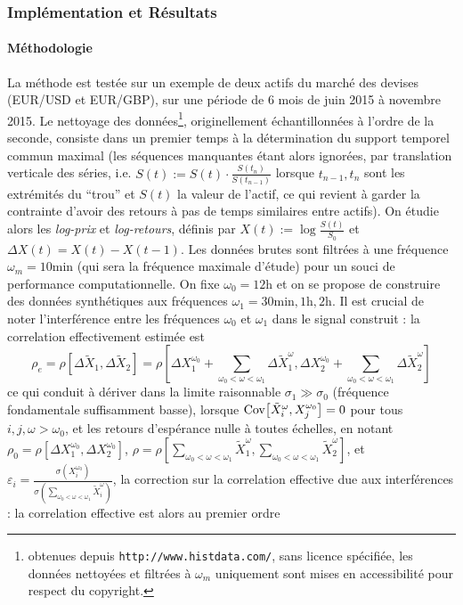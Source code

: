 \subsubsection{Implémentation et Résultats}

\paragraph{Méthodologie}

La méthode est testée sur un exemple de deux actifs du marché des devises (EUR/USD et EUR/GBP), sur une période de 6 mois de juin 2015 à novembre 2015. Le nettoyage des données\footnote{obtenues depuis \texttt{http://www.histdata.com/}, sans licence spécifiée, les données nettoyées et filtrées à $\omega_m$ uniquement sont mises en accessibilité pour respect du copyright.}, originellement échantillonnées à l'ordre de la seconde, consiste dans un premier temps à la détermination du support temporel commun maximal (les séquences manquantes étant alors ignorées, par translation verticale des séries, i.e. $S(t):=S(t)\cdot \frac{S(t_{n})}{S(t_{n-1})}$ lorsque $t_{n-1},t_n$ sont les extrémités du ``trou'' et $S(t)$ la valeur de l'actif, ce qui revient à garder la contrainte d'avoir des retours à pas de temps similaires entre actifs). On étudie alors les \emph{log-prix} et \emph{log-retours}, définis par $X(t):=\log{\frac{S(t)}{S_0}}$ et $\Delta X (t) = X(t) - X(t-1)$. Les données brutes sont filtrées à une fréquence $\omega_m = 10\textrm{min}$ (qui sera la fréquence maximale d'étude) pour un souci de performance computationnelle. On fixe $\omega_0=12\textrm{h}$ et on se propose de construire des données synthétiques aux fréquences $\omega_1 = 30\textrm{min},1\textrm{h},2\textrm{h}$. Il est crucial de noter l'interférence entre les fréquences $\omega_0$ et $\omega_1$ dans le signal construit : la correlation effectivement estimée est
\[
\rho_{e} = \rho \left[ \Delta \tilde{X}_1 , \Delta \tilde{X}_2 \right] = \rho \left[ \Delta X_1^{\omega_0} + \sum_{\omega_0 < \omega < \omega_1} \Delta \tilde{X}_1^{\omega} , \Delta X_2^{\omega_0} + \sum_{\omega_0 < \omega < \omega_1} \Delta \tilde{X}_2^{\omega}\right]
\]
ce qui conduit à dériver dans la limite raisonnable $\sigma_1 \gg \sigma_0$ (fréquence fondamentale suffisamment basse), lorsque $\operatorname{Cov}\!\left[\tilde{X}_i^{\omega},X_j^{\omega_0}\right]=0$ pour tous $i,j,\omega > \omega_0$, et les retours d'espérance nulle à toutes échelles, en notant $\rho_0 = \rho \left[ \Delta X_1^{\omega_0} , \Delta X_2^{\omega_0} \right]$, $\rho = \rho \left[ \sum_{\omega_0 < \omega < \omega_1} \tilde{X}_1^{\omega} , \sum_{\omega_0 < \omega < \omega_1} \tilde{X}_2^{\omega} \right]$, et $\varepsilon_i = \frac{\sigma (X_i^{\omega_0})}{\sigma \left( \sum_{\omega_0 < \omega < \omega_1} \tilde{X}_i^{\omega}\right)}$, la correction sur la correlation effective due aux interférences : la correlation effective est alors au premier ordre

